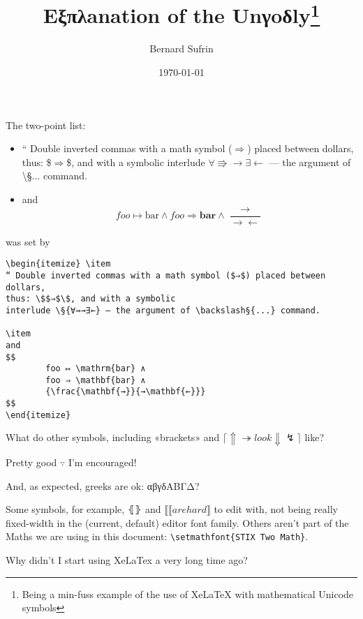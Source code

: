 \documentclass[11pt,a4paper]{article}
\author{Bernard Sufrin}
\title{Eξπλanation of the Unγoδly\footnote{Being a min-fuss example of the use of
XeLaTeX
with mathematical Unicode symbols}}
\date{\today}
\def\§#1{\symbolfamily{#1}}
\def\§#1{${#1}$}
\begin{document}
\maketitle

The two-point list:

\begin{itemize} \item
“ Double inverted commas with a math symbol ($⇒$) placed between dollars,
thus: \$$⇒$\$, and with a symbolic
interlude \§{∀⇛→∃←} — the argument of \backslash§{...} command.

\item
and 
$$
        foo ↦ \mathrm{bar} ∧
        foo ⇒ \mathbf{bar} ∧
        {\frac{\mathbf{→}}{→\mathbf{←}}}
$$
\end{itemize}
was set by
\begin{verbatim}
\begin{itemize} \item
“ Double inverted commas with a math symbol ($⇒$) placed between dollars,
thus: \$$⇒$\$, and with a symbolic
interlude \§{∀⇛→∃←} — the argument of \backslash§{...} command.

\item
and 
$$
        foo ↦ \mathrm{bar} ∧
        foo ⇒ \mathbf{bar} ∧
        {\frac{\mathbf{→}}{→\mathbf{←}}}
$$
\end{itemize}
\end{verbatim}
What do other symbols, including «brackets» and  $ ⌈⇑ ↠ look ⇓  ↯ ⌉$ like?

Pretty good $∵$ I'm encouraged!

And, as expected, greeks are ok:  αβγδΑΒΓΔ?

Some symbols, for example, $⦃⦄$ and \§{⟦ ⟦ are hard ⟧}
to edit with, not being really fixed-width in the (current, default) editor
font family. Others aren't part of the Maths we are using in this
document: \verb/\setmathfont{STIX Two Math}/.


Why didn't I start using XeLaTex a very long time ago?
\end{document}
